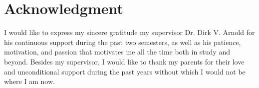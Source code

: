 \section*{Acknowledgment}
I would like to express my sincere gratitude my supervisor Dr. Dirk V. Arnold for his continuous support during the past two semesters, as well as his patience, motivation, and passion that motivates me all the time both in study and beyond. Besides my supervisor, I would like to thank my parents for their love and unconditional support during the past years without which I would not be where I am now. 








